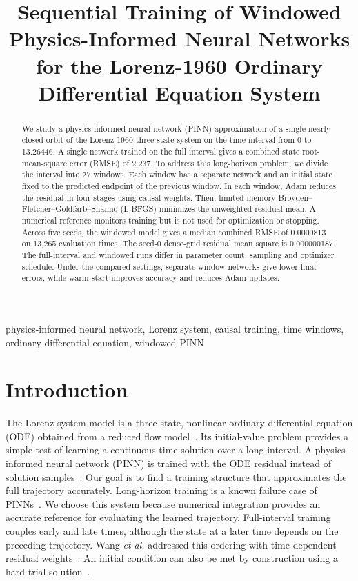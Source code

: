 \documentclass[conference,a4paper]{IEEEtran}
\begin{document}
\title{Sequential Training of Windowed Physics-Informed Neural Networks for the Lorenz-1960 Ordinary Differential Equation System}

\author{}

\maketitle

\begin{abstract}
We study a physics-informed neural network (PINN) approximation of a single nearly closed orbit of the Lorenz-1960 three-state system on the time interval from 0 to 13.26446. A single network trained on the full interval gives a combined state root-mean-square error (RMSE) of 2.237. To address this long-horizon problem, we divide the interval into 27 windows. Each window has a separate network and an initial state fixed to the predicted endpoint of the previous window. In each window, Adam reduces the residual in four stages using causal weights. Then, limited-memory Broyden–Fletcher–Goldfarb–Shanno (L-BFGS) minimizes the unweighted residual mean. A numerical reference monitors training but is not used for optimization or stopping. Across five seeds, the windowed model gives a median combined RMSE of 0.0000813 on 13,265 evaluation times. The seed-0 dense-grid residual mean square is 0.000000187. The full-interval and windowed runs differ in parameter count, sampling and optimizer schedule. Under the compared settings, separate window networks give lower final errors, while warm start improves accuracy and reduces Adam updates.

\end{abstract}

\begin{IEEEkeywords}
physics-informed neural network, Lorenz system, causal training, time windows, ordinary differential equation, windowed PINN
\end{IEEEkeywords}

\section{Introduction}
The Lorenz-system model is a three-state, nonlinear ordinary differential equation (ODE) obtained from a reduced flow model~\cite{lorenz1960}. Its initial-value problem provides a simple test of learning a continuous-time solution over a long interval. A physics-informed neural network (PINN) is trained with the ODE residual instead of solution samples~\cite{raissi2019}. Our goal is to find a training structure that approximates the full trajectory accurately. Long-horizon training is a known failure case of PINNs~\cite{wang2024causal,krishnapriyan2021}. We choose this system because numerical integration provides an accurate reference for evaluating the learned trajectory. Full-interval training couples early and late times, although the state at a later time depends on the preceding trajectory. Wang \emph{et al.} addressed this ordering with time-dependent residual weights~\cite{wang2024causal}. An initial condition can also be met by construction using a hard trial solution~\cite{lagaris1998}.
\end{document}
